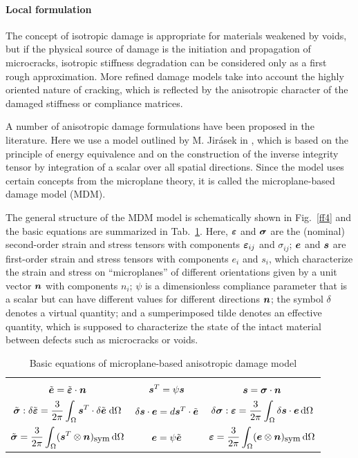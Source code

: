 \documentclass[a4paper]{article}
\newcommand{\mbf}[1]{\mbox{\boldmath$#1$}}
\newcommand{\eps} {\mbf{\varepsilon}}
\newcommand{\ve}{\mbf{e}}%
\newcommand{\vet}{\tilde{\ve}}
\newcommand{\veps}{\mbf{\varepsilon}}  %
\newcommand{\vsig}{\mbf{\sigma}}%
\newcommand{\vs}{\mbf{s}}%
\newcommand{\vepst}{\tilde{\veps}}
\newcommand{\vst}{\mbf{s}^T}%
\newcommand{\vsigt}{\tilde{\vsig}}
\newcommand{\dvepst}{\delta\tilde{\veps}}
\newcommand{\dvet}{\delta\vet}
\newcommand{\dvs}{\delta\vs}
\newcommand{\dvsig}{\delta\vsig}
\newcommand{\dO}{\,\mbox{d}\Omega}
\newcommand{\sym}{_{\mbox{\small sym}}}
\begin{document}
\paragraph{Local formulation}

The concept of isotropic damage is appropriate for materials weakened
by voids, but if the physical source of damage is the initiation and
propagation of microcracks, isotropic stiffness degradation
can be considered only as a first rough
approximation. More refined damage models take into account the highly
oriented nature of cracking, which is reflected by the anisotropic
character of the damaged stiffness or compliance matrices.

A number of anisotropic damage formulations have been proposed
in the literature. Here we use a model outlined by M. Jir\'{a}sek
in \cite{mdm}, which is based on the principle of energy
equivalence and on the construction of the inverse integrity
tensor by integration of a scalar over all spatial directions.
Since the model uses certain concepts from the
microplane theory, it is called the microplane-based damage model (MDM).

The general structure of the MDM
model is schematically shown in Fig.\ \ref{ff4}
and the basic equations are summarized in Tab.~\ref{tab2}.
Here, $\veps$ and $\vsig$ are the (nominal) second-order
strain and stress tensors
with components $\eps_{ij}$ and $\sigma_{ij}$; $\ve$ and $\vs$
are first-order strain and stress tensors with components $e_i$
and $s_i$, which characterize the strain and stress on ``microplanes''
of different orientations given by a unit vector $\mbf{n}$
with components $n_i$;
$\psi$ is a dimensionless compliance parameter
that is a scalar but can have different values for different
directions $\mbf{n}$;
the symbol $\delta$ denotes a virtual quantity; and a sumperimposed
tilde denotes an effective quantity, which is supposed to characterize the
state of the intact material between defects such as microcracks or voids.

\begin{table}[!htb]
\caption{Basic equations of microplane-based anisotropic damage model}
\label{tab2}
\begin{center}
\begin{tabular}{|c|c|c|}
\hline
&&\\
$\vet=\vepst\cdot\mbf{n}$
&
$\vst = \psi\vs$
&
$\vs=\vsig\cdot\mbf{n}$
\\[5mm]
$\vsigt:\dvepst = \displaystyle\frac{3}{2\pi} \int_{\Omega}\vst\cdot\dvet\;\mbox{d}\Omega$
&
$\dvs\cdot\ve=d\vst\cdot\vet$
&
$\dvsig:\veps = \displaystyle\frac{3}{2\pi} \int_{\Omega}\dvs\cdot\ve\dO$
\\[5mm]
$\vsigt = \displaystyle\frac{3}{2\pi}\int_\Omega (\vst\otimes\mbf{n})\sym\dO$
&
$\ve=\psi\vet$
&
$\veps = \displaystyle\frac{3}{2\pi}\int_\Omega (\ve\otimes\mbf{n})\sym\dO$
\\[5mm]
\hline
\end{tabular}
\end{center}
\end{table}
\end{document}
